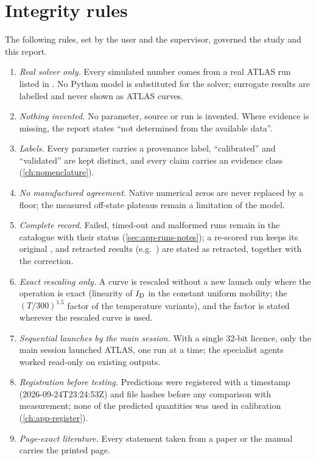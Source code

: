 \section{Integrity rules}\label{sec:repro-integrity}

The following rules, set by the user and the supervisor, governed the study and this report.
\begin{enumerate}
  \item \emph{Real solver only.} Every simulated number comes from a real ATLAS run listed in
        . No Python model is substituted for the solver; surrogate results are labelled
        \evSURR{} and never shown as ATLAS curves.
  \item \emph{Nothing invented.} No parameter, source or run is invented. Where evidence is missing, the report states
        ``not determined from the available data''.
  \item \emph{Labels.} Every parameter carries a provenance label, ``calibrated'' and ``validated'' are kept distinct,
        and every claim carries an evidence class (\cref{ch:nomenclature}).
  \item \emph{No manufactured agreement.} Native numerical zeros are never replaced by a floor; the measured off-state
        plateaus remain a limitation of the model.
  \item \emph{Complete record.} Failed, timed-out and malformed runs remain in the catalogue with their status
        (\cref{sec:app-runs-notes}); a re-scored run keeps its original , and retracted results
        (e.g.\ ) are stated as retracted, together with the correction.
  \item \emph{Exact rescaling only.} A curve is rescaled without a new launch only where the operation is exact (linearity
        of $I_{\mathrm{D}}$ in the constant uniform mobility; the $(T/300)^{1.5}$ factor of the temperature variants), and the
        factor is stated wherever the rescaled curve is used.
  \item \emph{Sequential launches by the main session.} With a single 32-bit licence, only the main session launched
        ATLAS, one run at a time; the specialist agents worked read-only on existing outputs.
  \item \emph{Registration before testing.} Predictions were registered with a timestamp (2026-09-24T23:24:53Z) and file
        hashes before any comparison with measurement; none of the predicted quantities was used in calibration
        (\cref{ch:app-register}).
  \item \emph{Page-exact literature.} Every statement taken from a paper or the manual carries the printed page.
\end{enumerate}

